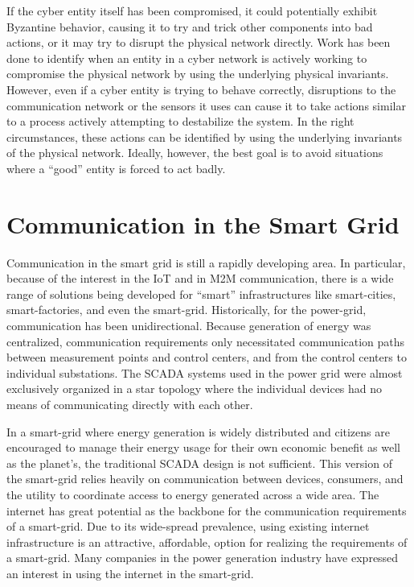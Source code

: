 If the cyber entity itself has been compromised, it could potentially exhibit Byzantine behavior, causing it to try and trick other components into bad actions\cite{Roth2012}, or it may try to disrupt the physical network directly.
Work has been done to identify when an entity in a cyber network is actively working to compromise the physical network by using the underlying physical invariants.
However, even if a cyber entity is trying to behave correctly, disruptions to the communication network or the sensors it uses can cause it to take actions similar to a process actively attempting to destabilize the system.
In the right circumstances, these actions can be identified by using the underlying invariants of the physical network.
Ideally, however, the best goal is to avoid situations where a ``good'' entity is forced to act badly.

\section{Communication in the Smart Grid}

Communication in the smart grid is still a rapidly developing area.
In particular, because of the interest in the \ac{IoT} and in \ac{M2M} communication, there is a wide range of solutions being developed for ``smart'' infrastructures like smart-cities, smart-factories, and even the smart-grid.
Historically, for the power-grid, communication has been unidirectional.
Because generation of energy was centralized, communication requirements only necessitated communication paths between measurement points and control centers, and from the control centers to individual substations\cite{smartgrid-comm1}.
The \ac{SCADA} systems used in the power grid were almost exclusively organized in a star topology where the individual devices had no means of communicating directly with each other.

In a smart-grid where energy generation is widely distributed and citizens are encouraged to manage their energy usage for their own economic benefit as well as the planet's, the traditional \ac{SCADA} design is not sufficient\cite{smartgrid-comm1}\cite{smartgrid-comm-lastmile}\cite{smartgrid-comm-m2m}.
This version of the smart-grid relies heavily on communication between devices, consumers, and the utility to coordinate access to energy generated across a wide area.
The internet has great potential as the backbone for the communication requirements of a smart-grid.
Due to its wide-spread prevalence, using existing internet infrastructure is an attractive, affordable, option for realizing the requirements of a smart-grid\cite{smartgrid-comm-germany}\cite{smartgrid-comm-lastmile}.
Many companies in the power generation industry have expressed an interest in using the internet in the smart-grid\cite{smartgrid-comm-doe}.

